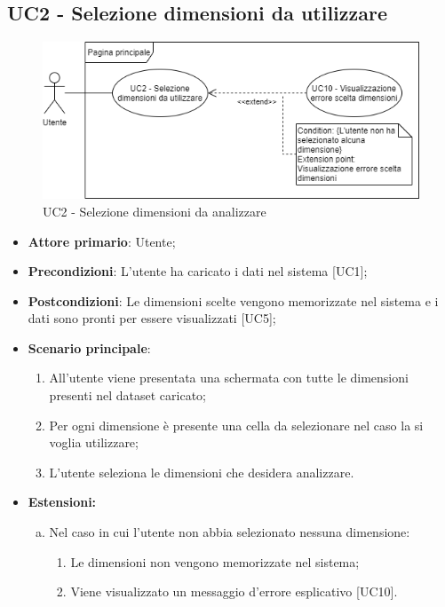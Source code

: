 \subsection{UC2 - Selezione dimensioni da utilizzare}
\begin{figure}[h]
\includegraphics[width=\linewidth]{Section/Images/UC2.png}
\centering
\caption{UC2 - Selezione dimensioni da analizzare}
\end{figure}
\begin{itemize}
	\item \textbf{Attore primario}: Utente;
	\item \textbf{Precondizioni}: L'utente ha caricato i dati nel sistema [UC1];
	\item \textbf{Postcondizioni}: Le dimensioni scelte vengono memorizzate nel sistema e i dati sono pronti per essere visualizzati [UC5];
	\item \textbf{Scenario principale}:
		\begin{enumerate}
			\item All'utente viene presentata una schermata con tutte le dimensioni presenti nel dataset caricato;
			\item Per ogni dimensione è presente una cella da selezionare nel caso la si voglia utilizzare;
			\item L'utente seleziona le dimensioni che desidera analizzare.
		\end{enumerate}
	\item \textbf{Estensioni:}
		\begin{enumerate}[(a)]
			\item Nel caso in cui l'utente non abbia selezionato nessuna dimensione:
			\begin{enumerate}[1.]
				\item Le dimensioni non vengono memorizzate nel sistema;
				\item Viene visualizzato un messaggio d'errore esplicativo [UC10].
			\end{enumerate}
		\end{enumerate}
\end{itemize}